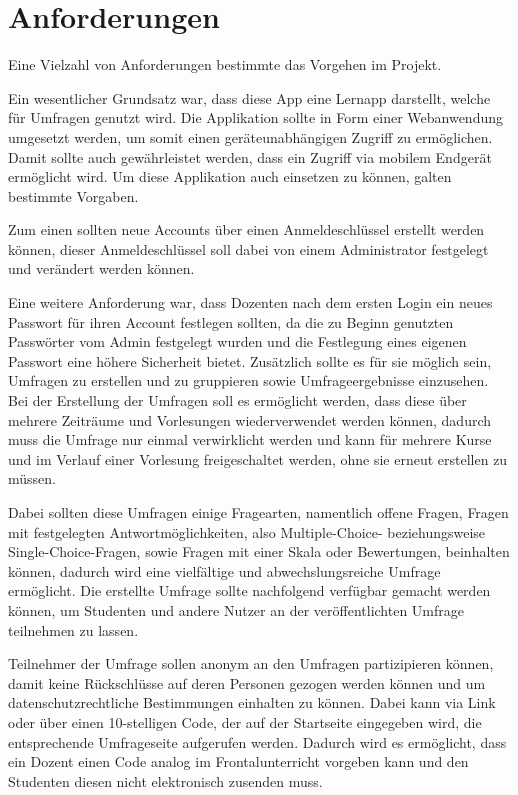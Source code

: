 \section{Anforderungen}

Eine Vielzahl von Anforderungen bestimmte das Vorgehen im Projekt.

Ein wesentlicher Grundsatz war, dass diese App eine Lernapp darstellt, welche für Umfragen genutzt wird. Die Applikation sollte in Form einer Webanwendung umgesetzt werden, um somit einen geräteunabhängigen Zugriff zu ermöglichen.
Damit sollte auch gewährleistet werden, dass ein Zugriff via mobilem Endgerät ermöglicht wird. 
Um diese Applikation auch einsetzen zu können, galten bestimmte Vorgaben.

Zum einen sollten neue Accounts über einen Anmeldeschlüssel erstellt werden können, dieser Anmeldeschlüssel soll dabei von einem Administrator festgelegt und verändert werden können.

Eine weitere Anforderung war, dass Dozenten nach dem ersten Login ein neues Passwort für ihren Account festlegen sollten, da die zu Beginn genutzten Passwörter vom Admin festgelegt wurden und die Festlegung eines eigenen Passwort eine höhere Sicherheit bietet.
Zusätzlich sollte es für sie möglich sein, Umfragen zu erstellen und zu gruppieren sowie Umfrageergebnisse einzusehen.
Bei der Erstellung der Umfragen soll es ermöglicht werden, dass diese über mehrere Zeiträume und Vorlesungen wiederverwendet werden können, dadurch muss die Umfrage nur einmal verwirklicht werden und kann für mehrere Kurse und im Verlauf einer Vorlesung freigeschaltet werden, ohne sie erneut erstellen zu müssen.

Dabei sollten diese Umfragen einige Fragearten, namentlich offene Fragen, Fragen mit festgelegten Antwortmöglichkeiten, also Multiple-Choice- beziehungsweise Single-Choice-Fragen, sowie Fragen mit einer Skala oder Bewertungen, beinhalten können, dadurch wird eine vielfältige und abwechslungsreiche Umfrage ermöglicht.
Die erstellte Umfrage sollte nachfolgend verfügbar gemacht werden können, um Studenten und andere Nutzer an der veröffentlichten Umfrage teilnehmen zu lassen.

Teilnehmer der Umfrage sollen anonym an den Umfragen partizipieren können, damit keine Rückschlüsse auf deren Personen gezogen werden können und um datenschutzrechtliche Bestimmungen einhalten zu können. Dabei kann via Link oder über einen 10-stelligen Code, der auf der Startseite eingegeben wird, die entsprechende Umfrageseite aufgerufen werden. Dadurch wird es ermöglicht, dass ein Dozent einen Code analog im Frontalunterricht vorgeben kann und den Studenten diesen nicht elektronisch zusenden muss.

